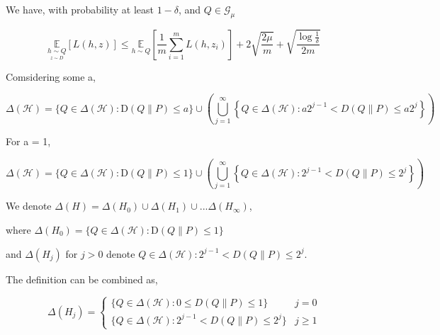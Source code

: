 \documentclass{article}
\begin{document}
We have, with probability at least $1-\delta$, and $Q \in \mathcal{G}_{\mu}$ 

\begin{equation}
  \underset{\underset{z \sim D}{h \sim Q}}{\mathbb{E}}[L(h, z)] \leq \underset{h \sim Q}{\mathbb{E}}\left[\frac{1}{m} \sum_{i=1}^{m} L\left(h, z_{i}\right)\right]+
  2 \sqrt{\frac{2 \mu}{m}}
  +\sqrt{\frac{\log \frac{1}{\delta}}{2 m}} \label{eq:r_comp}
\end{equation}



Comsidering some a,

\begin{equation}
  \Delta(\mathcal{H}) =  \{Q \in \Delta(\mathcal{H}): \mathrm{D}(Q \| P) \leq a\} 	\cup (\bigcup_{j=1}^{\infty}\left\{Q \in \Delta(\mathcal{H}): a 2^{j-1}<D(Q \| P) \leq a 2^{j}\right\})
\end{equation}

For a = 1,


\begin{equation}
    \Delta(\mathcal{H}) =  \{Q \in \Delta(\mathcal{H}): \mathrm{D}(Q \| P) \leq 1\} 	\cup (\bigcup_{j=1}^{\infty}\left\{Q \in \Delta(\mathcal{H}): 2^{j-1}<D(Q \| P) \leq 2^{j}\right\})
\end{equation}

We denote $\Delta{(H)} = \Delta{(H_0)} \cup \Delta{(H_1)} \cup ...\Delta{(H_{\infty})}   $,

where $\Delta(H_0) =\{Q \in \Delta(\mathcal{H}): \mathrm{D}(Q \| P) \leq 1\}$ 

and $\Delta(H_j)$ for $j>0$ denote ${Q \in \Delta(\mathcal{H}): 2^{j-1}<D(Q \| P) \leq 2^{j}}$.


The definition can be combined as,

\begin{equation}
    \Delta(H_j) =
    \left\{
           \begin{array}{lcl}
            \{Q \in \Delta(\mathcal{H}): 0 \leq D(Q \| P) \leq 1\} & j=0\\
            \{Q \in \Delta(\mathcal{H}):  2^{j-1}<D(Q \| P) \leq 2^{j}\} &j \geq 1 
           \end{array}
        \right.
\end{equation}

\end{document}
